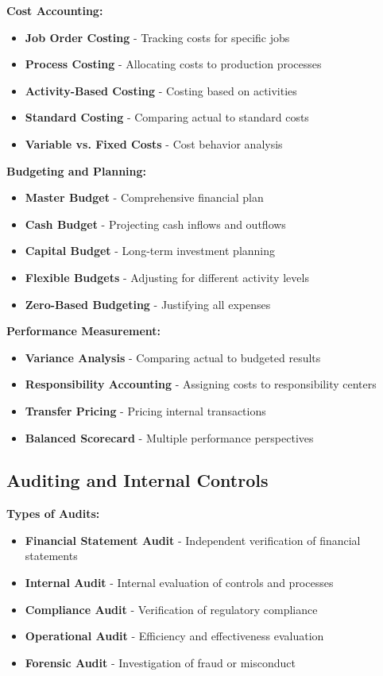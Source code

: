 \documentclass[12pt]{article}
\begin{document}
\textbf{Cost Accounting:}
\begin{itemize}
    \item \textbf{Job Order Costing} - Tracking costs for specific jobs
    \item \textbf{Process Costing} - Allocating costs to production processes
    \item \textbf{Activity-Based Costing} - Costing based on activities
    \item \textbf{Standard Costing} - Comparing actual to standard costs
    \item \textbf{Variable vs. Fixed Costs} - Cost behavior analysis
\end{itemize}

\textbf{Budgeting and Planning:}
\begin{itemize}
    \item \textbf{Master Budget} - Comprehensive financial plan
    \item \textbf{Cash Budget} - Projecting cash inflows and outflows
    \item \textbf{Capital Budget} - Long-term investment planning
    \item \textbf{Flexible Budgets} - Adjusting for different activity levels
    \item \textbf{Zero-Based Budgeting} - Justifying all expenses
\end{itemize}

\textbf{Performance Measurement:}
\begin{itemize}
    \item \textbf{Variance Analysis} - Comparing actual to budgeted results
    \item \textbf{Responsibility Accounting} - Assigning costs to responsibility centers
    \item \textbf{Transfer Pricing} - Pricing internal transactions
    \item \textbf{Balanced Scorecard} - Multiple performance perspectives
\end{itemize}

\subsection{Auditing and Internal Controls}

\textbf{Types of Audits:}
\begin{itemize}
    \item \textbf{Financial Statement Audit} - Independent verification of financial statements
    \item \textbf{Internal Audit} - Internal evaluation of controls and processes
    \item \textbf{Compliance Audit} - Verification of regulatory compliance
    \item \textbf{Operational Audit} - Efficiency and effectiveness evaluation
    \item \textbf{Forensic Audit} - Investigation of fraud or misconduct
\end{itemize}
\end{document}

